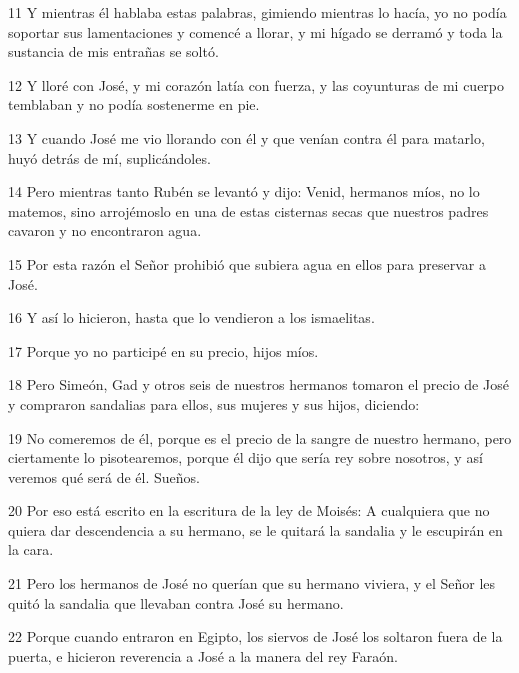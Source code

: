 \par 11 Y mientras él hablaba estas palabras, gimiendo mientras lo hacía, yo no podía soportar sus lamentaciones y comencé a llorar, y mi hígado se derramó y toda la sustancia de mis entrañas se soltó.

\par 12 Y lloré con José, y mi corazón latía con fuerza, y las coyunturas de mi cuerpo temblaban y no podía sostenerme en pie.

\par 13 Y cuando José me vio llorando con él y que venían contra él para matarlo, huyó detrás de mí, suplicándoles.

\par 14 Pero mientras tanto Rubén se levantó y dijo: Venid, hermanos míos, no lo matemos, sino arrojémoslo en una de estas cisternas secas que nuestros padres cavaron y no encontraron agua.

\par 15 Por esta razón el Señor prohibió que subiera agua en ellos para preservar a José.

\par 16 Y así lo hicieron, hasta que lo vendieron a los ismaelitas.

\par 17 Porque yo no participé en su precio, hijos míos.

\par 18 Pero Simeón, Gad y otros seis de nuestros hermanos tomaron el precio de José y compraron sandalias para ellos, sus mujeres y sus hijos, diciendo:

\par 19 No comeremos de él, porque es el precio de la sangre de nuestro hermano, pero ciertamente lo pisotearemos, porque él dijo que sería rey sobre nosotros, y así veremos qué será de él. Sueños.

\par 20 Por eso está escrito en la escritura de la ley de Moisés: A cualquiera que no quiera dar descendencia a su hermano, se le quitará la sandalia y le escupirán en la cara.

\par 21 Pero los hermanos de José no querían que su hermano viviera, y el Señor les quitó la sandalia que llevaban contra José su hermano.

\par 22 Porque cuando entraron en Egipto, los siervos de José los soltaron fuera de la puerta, e hicieron reverencia a José a la manera del rey Faraón.

